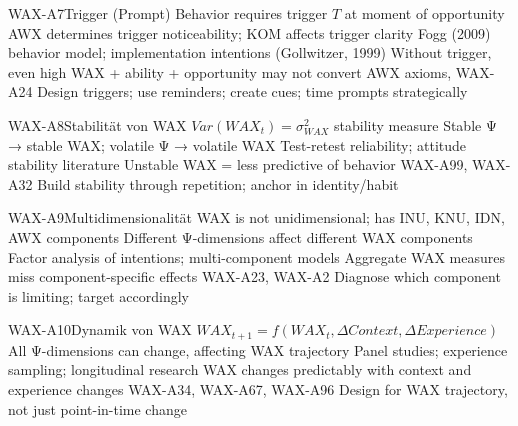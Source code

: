 \begin{axiomspec}{WAX-A7}{Trigger (Prompt)}
 Behavior requires trigger $T$ at moment of opportunity
 AWX determines trigger noticeability; KOM affects trigger clarity
 Fogg (2009) behavior model; implementation intentions (Gollwitzer, 1999)
 Without trigger, even high WAX + ability + opportunity may not convert
 AWX axioms, WAX-A24
 Design triggers; use reminders; create cues; time prompts strategically
\end{axiomspec}


\begin{axiomspec}{WAX-A8}{Stabilität von WAX}
 $Var(WAX_t) = \sigma^2_{WAX}$ stability measure
 Stable Ψ → stable WAX; volatile Ψ → volatile WAX
 Test-retest reliability; attitude stability literature
 Unstable WAX = less predictive of behavior
 WAX-A99, WAX-A32
 Build stability through repetition; anchor in identity/habit
\end{axiomspec}


\begin{axiomspec}{WAX-A9}{Multidimensionalität}
 WAX is not unidimensional; has INU, KNU, IDN, AWX components
 Different Ψ-dimensions affect different WAX components
 Factor analysis of intentions; multi-component models
 Aggregate WAX measures miss component-specific effects
 WAX-A23, WAX-A2
 Diagnose which component is limiting; target accordingly
\end{axiomspec}


\begin{axiomspec}{WAX-A10}{Dynamik von WAX}
 $WAX_{t+1} = f(WAX_t, \Delta Context, \Delta Experience)$
 All Ψ-dimensions can change, affecting WAX trajectory
 Panel studies; experience sampling; longitudinal research
 WAX changes predictably with context and experience changes
 WAX-A34, WAX-A67, WAX-A96
 Design for WAX trajectory, not just point-in-time change
\end{axiomspec}

